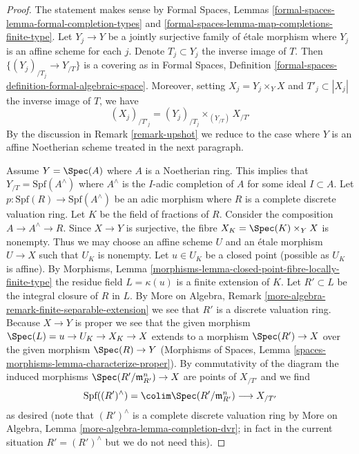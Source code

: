 \begin{proof}
The statement makes sense by
Formal Spaces, Lemmas \ref{formal-spaces-lemma-formal-completion-types} and
\ref{formal-spaces-lemma-map-completions-finite-type}.
Let $Y_j \to Y$ be a jointly surjective family of \'etale morphism
where $Y_j$ is an affine scheme for each $j$.
Denote $T_j \subset Y_j$ the inverse image of $T$.
Then $\{(Y_j)_{/T_j} \to Y_{/T}\}$ is a covering as in
Formal Spaces, Definition \ref{formal-spaces-definition-formal-algebraic-space}.
Moreover, setting $X_j = Y_j \times_Y X$ and $T'_j \subset |X_j|$
the inverse image of $T$, we have
$$
(X_j)_{/T'_j} = (Y_j)_{/T_j} \times_{(Y_{/T})} X_{/T'}
$$
By the discussion in Remark \ref{remark-upshot} we reduce to the case where
$Y$ is an affine Noetherian scheme treated in the next paragraph.

\medskip\noindent
Assume $Y = \Spec(A)$ where $A$ is a Noetherian ring. This implies that
$Y_{/T} = \text{Spf}(A^\wedge)$ where $A^\wedge$ is the $I$-adic completion
of $A$ for some ideal $I \subset A$. Let
$p : \text{Spf}(R) \to \text{Spf}(A^\wedge)$
be an adic morphism where $R$ is a complete discrete valuation ring.
Let $K$ be the field of fractions of $R$.
Consider the composition $A \to A^\wedge \to R$.
Since $X \to Y$ is surjective, the fibre $X_K = \Spec(K) \times_Y X$
is nonempty. Thus we may choose an affine scheme $U$ and an \'etale
morphism $U \to X$ such that $U_K$ is nonempty.
Let $u \in U_K$ be a closed point (possible as $U_K$ is affine). By
Morphisms, Lemma \ref{morphisms-lemma-closed-point-fibre-locally-finite-type}
the residue field $L = \kappa(u)$ is a finite extension of $K$. Let
$R' \subset L$ be the integral closure of $R$ in $L$. By
More on Algebra, Remark \ref{more-algebra-remark-finite-separable-extension}
we see that $R'$ is a discrete valuation ring.
Because $X \to Y$ is proper we see that the given morphism
$\Spec(L) = u \to U_K \to X_K \to X$ extends to a morphism
$\Spec(R') \to X$ over the given morphism $\Spec(R) \to Y$
(Morphisms of Spaces,
Lemma \ref{spaces-morphisms-lemma-characterize-proper}).
By commutativity of the diagram the induced morphisms
$\Spec(R'/\mathfrak m_{R'}^n) \to X$ are points of $X_{/T'}$
and we find
$$
\text{Spf}((R')^\wedge) = \colim \Spec(R'/\mathfrak m_{R'}^n)
\longrightarrow X_{/T'}
$$
as desired (note that $(R')^\wedge$ is a complete discrete valuation ring
by More on Algebra, Lemma \ref{more-algebra-lemma-completion-dvr};
in fact in the current situation $R' = (R')^\wedge$ but we do not
need this).
\end{proof}

